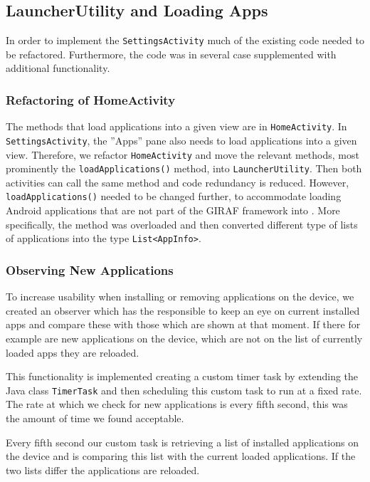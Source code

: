 \subsection{LauncherUtility and Loading Apps}\label{sect:sprint3:refactoring}
In order to implement the \lstinline!SettingsActivity! much of the existing code needed to be refactored.
Furthermore, the code was in several case supplemented with additional functionality.

\subsubsection{Refactoring of HomeActivity}
The methods that load applications into a given view are in \lstinline!HomeActivity!.
In \lstinline!SettingsActivity!, the ''Apps'' pane also needs to load applications into a given view.
Therefore, we refactor \lstinline!HomeActivity! and move the relevant methods, most prominently the \lstinline|loadApplications()| method, into \lstinline!LauncherUtility!.
Then both activities can call the same method and code redundancy is reduced. 
However, \lstinline|loadApplications()| needed to be changed further, to accommodate loading Android applications that are not part of the GIRAF framework  into \launcher. 
More specifically, the method was overloaded and then converted different type of lists of applications into the \giraf type \lstinline|List<AppInfo>|.

\subsubsection{Observing New Applications}\label{sec:sprint3:observing}
To increase usability when installing or removing applications on the device, we created an observer which has the responsible to keep an eye on current installed apps and compare these with those which are shown at that moment. If there for example are new applications on the device, which are not on the list of currently loaded apps they are reloaded.

This functionality is implemented creating a custom timer task by extending the Java class \lstinline!TimerTask! and then scheduling this custom task to run at a fixed rate. The rate at which we check for new applications is every fifth second, this was the amount of time we found acceptable.

Every fifth second our custom task is retrieving a list of installed applications on the device and is comparing this list with the current loaded applications. If the two lists differ the applications are reloaded.